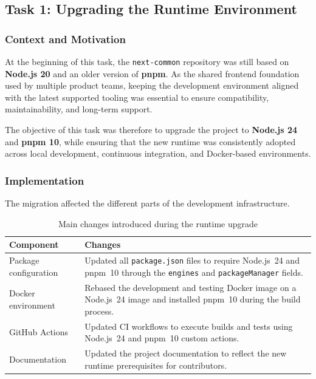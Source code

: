 \subsection{Task 1: Upgrading the Runtime Environment}

\subsubsection{Context and Motivation}

At the beginning of this task, the \texttt{next-common} repository was still based on \textbf{Node.js 20} and an older version of \textbf{pnpm}. As the shared frontend foundation used by multiple product teams, keeping the development environment aligned with the latest supported tooling was essential to ensure compatibility, maintainability, and long-term support.

The objective of this task was therefore to upgrade the project to \textbf{Node.js 24} and \textbf{pnpm 10}, while ensuring that the new runtime was consistently adopted across local development, continuous integration, and Docker-based environments.

\subsubsection{Implementation}

The migration affected the different parts of the development infrastructure.
\begin{table}[H]
\centering
\caption{Main changes introduced during the runtime upgrade}
\label{tab:runtime-upgrade}

\begin{tabular}{|p{4cm}|p{11cm}|}
\hline
\textbf{Component} & \textbf{Changes} \\
\hline

Package configuration &
Updated all \texttt{package.json} files to require Node.js~24 and pnpm~10 through the \texttt{engines} and \texttt{packageManager} fields. \\
\hline

Docker environment &
Rebased the development and testing Docker image on a Node.js~24 image and installed pnpm~10 during the build process. \\
\hline

GitHub Actions &
Updated CI workflows to execute builds and tests using Node.js~24 and pnpm~10 custom actions.\\
\hline

Documentation &
Updated the project documentation to reflect the new runtime prerequisites for contributors. \\
\hline

\end{tabular}
\end{table}


